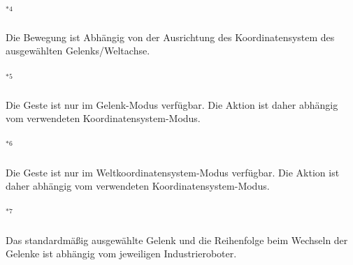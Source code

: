 \paragraph*{$^{\ast4}$}\label{ast:gesten_anmerkung_4}\small{Die Bewegung ist Abhängig von der Ausrichtung des Koordinatensystem des ausgewählten Gelenks/Weltachse.}\vspace{-0.75em}
\paragraph*{$^{\ast5}$}\label{ast:gesten_anmerkung_5}\small{Die Geste ist nur im Gelenk-Modus verfügbar. Die Aktion ist daher abhängig vom verwendeten Koordinatensystem-Modus.}\vspace{-0.75em}
\paragraph*{$^{\ast6}$}\label{ast:gesten_anmerkung_6}\small{Die Geste ist nur im Weltkoordinatensystem-Modus verfügbar. Die Aktion ist daher abhängig vom verwendeten Koordinatensystem-Modus.}\vspace{-0.75em}
\paragraph*{$^{\ast7}$}\label{ast:gesten_anmerkung_7}\small{Das standardmäßig ausgewählte Gelenk und die Reihenfolge beim Wechseln der Gelenke ist abhängig vom jeweiligen Industrieroboter.}\vspace{-0.75em}
\newline\newline

